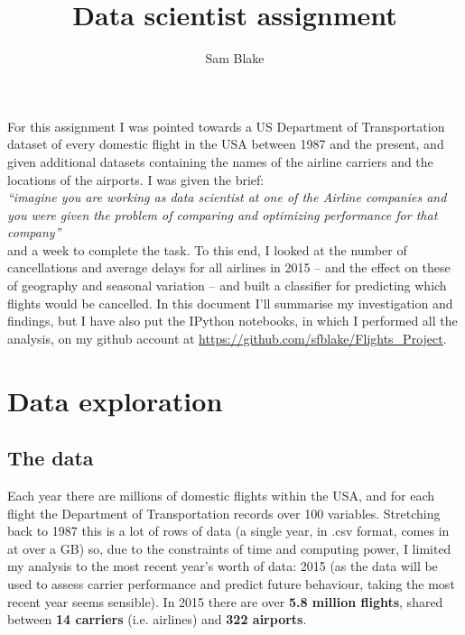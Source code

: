 \documentclass[a4paper]{article}
\begin{document}
\addtolength{\voffset}{-0.5in}
\pagestyle{empty}
\setlength\parskip{5pt}
\title{Data scientist assignment}
\author{Sam Blake}
\maketitle
For this assignment I was pointed towards a US Department of Transportation dataset of every domestic flight in the USA between 1987 and the present, and given additional datasets containing the names of the airline carriers and the locations of the airports. I was given the brief: \\
\textit{``imagine you are working as data scientist at one of the Airline companies and you were given the problem of comparing and optimizing performance for that company''}\\
and a week to complete the task. To this end, I looked at the number of cancellations and average delays for all airlines in 2015 -- and the effect on these of geography and seasonal variation -- and built a classifier for predicting which flights would be cancelled. In this document I'll summarise my investigation and findings, but I have also put the IPython notebooks, in which I performed all the analysis, on my github account at \url{https://github.com/sfblake/Flights_Project}.

\section*{Data exploration}

\subsection*{The data}
Each year there are millions of domestic flights within the USA, and for each flight the Department of Transportation records over 100 variables. Stretching back to 1987 this is a lot of rows of data (a single year, in .csv format, comes in at over a GB) so, due to the constraints of time and computing power, I limited my analysis to the most recent year's worth of data: 2015 (as the data will be used to assess carrier performance and predict future behaviour, taking the most recent year seems sensible). In 2015 there are over \textbf{5.8 million flights}, shared between \textbf{14 carriers} (i.e. airlines) and \textbf{322 airports}.
\end{document}
